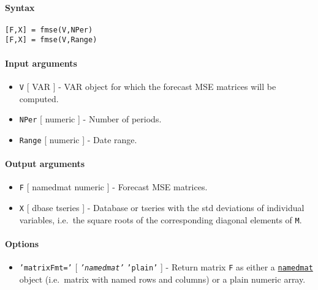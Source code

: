 


	\paragraph{Syntax}\label{syntax}

\begin{verbatim}
[F,X] = fmse(V,NPer)
[F,X] = fmse(V,Range)
\end{verbatim}

\paragraph{Input arguments}\label{input-arguments}

\begin{itemize}
\item
  \texttt{V} {[} VAR {]} - VAR object for which the forecast MSE
  matrices will be computed.
\item
  \texttt{NPer} {[} numeric {]} - Number of periods.
\item
  \texttt{Range} {[} numeric {]} - Date range.
\end{itemize}

\paragraph{Output arguments}\label{output-arguments}

\begin{itemize}
\item
  \texttt{F} {[} namedmat \textbar{} numeric {]} - Forecast MSE
  matrices.
\item
  \texttt{X} {[} dbase \textbar{} tseries {]} - Database or tseries with
  the std deviations of individual variables, i.e.~the square roots of
  the corresponding diagonal elements of \texttt{M}.
\end{itemize}

\paragraph{Options}\label{options}

\begin{itemize}
\itemsep1pt\parskip0pt
\item
  \texttt{'matrixFmt='} {[} \emph{\texttt{'namedmat'}} \textbar{}
  \texttt{'plain'} {]} - Return matrix \texttt{F} as either a
  \href{namedmat/Contents}{\texttt{namedmat}} object (i.e.~matrix with
  named rows and columns) or a plain numeric array.
\end{itemize}



